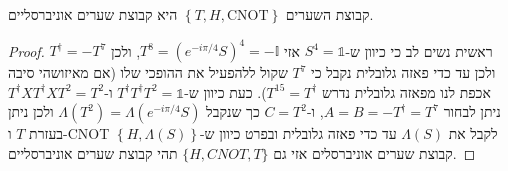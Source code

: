 \documentclass{tstextbook}
\begin{document}
\begin{proposition}
קבוצת השערים \(\left\{  T,H,\mathrm{CNOT}  \right\}\) היא קבוצת שערים אוניברסליים.

\end{proposition}
\begin{proof}
ראשית נשים לב כי כיוון ש-\(S^{4}=\mathbb{1}\) אזי \(T^{8}=\left( e^{ -i\pi/4 }S \right)^{4}=-\mathbb{I}\), ולכן \(T^{\dagger}=-T^{7}\) ולכן עד כדי פאזה גלובלית נקבל כי \(T^{7}\) שקול ללהפעיל את ההופכי שלו (אם מאיזושהי סיבה אכפת לנו מפאזה גלובלית נדרש \(T^{15}=T^{\dagger}\)). כעת כיוון ש-\(T^{\dagger}T^{\dagger}T^{2}=\mathbb{1}\) ו-\(T^{\dagger}XT^{\dagger}XT^{2}=T^{2}\) ניתן לבחור \(A=B=-T^{\dagger}=T^{7}\), ו-\(C=T^{2}\) כך שנקבל \(\Lambda(T^{2})=\Lambda \left( e^{ -i\pi/4 }S \right)\) ולכן ניתן בעזרת \(T\) ו-CNOT לקבל את \(\Lambda(S)\) עד כדי פאזה גלובלית ובפרט כיוון ש-\(\left\{  H,\Lambda(S)  \right\}\) קבוצת שערים אוניברסלים אזי גם \(\{ H,CNOT,T \}\) תהי קבוצת שערים אוניברסליים.

\end{proof}
\end{document}
